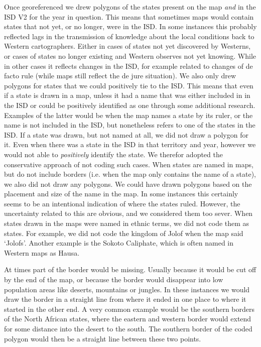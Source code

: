 \documentclass[12pt]{article}
\begin{document}
Once georeferenced we drew polygons of the states present on the map \emph{and}
in the ISD V2 for the year in question. This means that sometimes maps would
contain states that not yet, or no longer, were in the ISD. In some instances
this probably reflected lags in the transmission of knowledge about the local
conditions back to Western cartographers. Either in cases of states not yet
discovered by Westerns, or cases of states no longer existing and Western
observes not yet knowing. While in other cases it reflects changes in the ISD,
for example related to changes of de facto rule (while maps still reflect the de
jure situation). We also only drew polygons for states that we could positively
tie to the ISD. This means that even if a state is drawn in a map, unless it had
a name that was either included in in the ISD or could be positively identified
as one through some additional research. Examples of the latter would be when
the map names a state by its ruler, or the name is not included in the ISD, but
nonetheless refers to one of the states in the ISD. If a state was drawn, but
not named at all, we did not draw a polygon for it. Even when there was a state
in the ISD in that territory and year, however we would not able to
\emph{positively} identify the state. We therefor adopted the conservative
approach of not coding such cases. When states are named in maps, but do not
include borders (i.e. when the map only contains the name of a state), we also
did not draw any polygons. We could have drawn polygons based on the placement
and size of the name in the map. In some instances this certainly seems to be an
intentional indication of where the states ruled. However, the uncertainty
related to this are obvious, and we considered them too sever. When states drawn
in the maps were named in ethnic terms, we did not code them as states. For
example, we did not code the kingdom of Jolof when the map said `Jolofs'.
Another example is the Sokoto Caliphate, which is often named in Western maps as
Hausa. 

At times part of the border would be missing.
Usually because it would be cut off by the end of the map, or because the border would disappear into low population areas like deserts, mountains or jungles.
In these instances we would draw the border in a straight line from where it ended in one place to where it started in the other end. 
A very common example would be the southern borders of the North African states, where the eastern and western border would extend for some distance into the desert to the south. 
The southern border of the coded polygon would then be a straight line between these two points.
\end{document}
